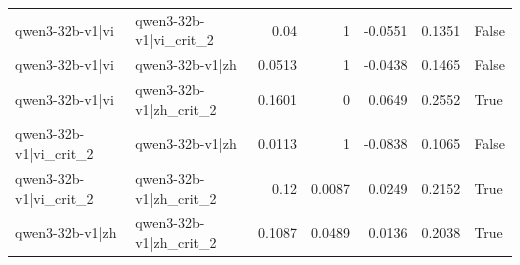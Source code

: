 \begin{table}
\begin{tabular}{l l r r r r l}
qwen3-32b-v1|vi & qwen3-32b-v1|vi_crit_2 & 0.04 & 1 & -0.0551 & 0.1351 & False \\
qwen3-32b-v1|vi & qwen3-32b-v1|zh & 0.0513 & 1 & -0.0438 & 0.1465 & False \\
qwen3-32b-v1|vi & qwen3-32b-v1|zh_crit_2 & 0.1601 & 0 & 0.0649 & 0.2552 & True \\
qwen3-32b-v1|vi_crit_2 & qwen3-32b-v1|zh & 0.0113 & 1 & -0.0838 & 0.1065 & False \\
qwen3-32b-v1|vi_crit_2 & qwen3-32b-v1|zh_crit_2 & 0.12 & 0.0087 & 0.0249 & 0.2152 & True \\
qwen3-32b-v1|zh & qwen3-32b-v1|zh_crit_2 & 0.1087 & 0.0489 & 0.0136 & 0.2038 & True \\
\bottomrule
\end{tabular}
\end{table}
